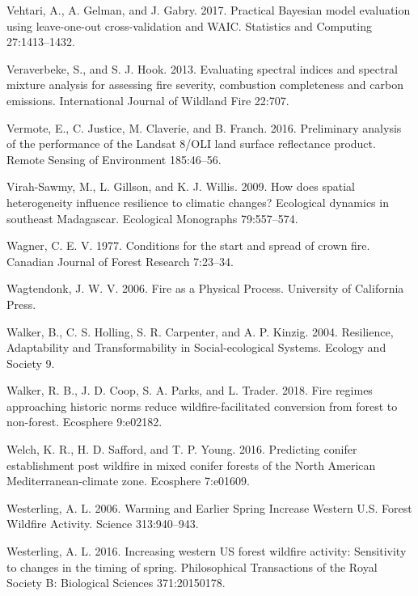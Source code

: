 \documentclass[twoside,12pt,final]{ucthesis-CA2012}
\begin{document}
\begin{ucmainmatter}
\hypertarget{ref-vehtari2017}{}
Vehtari, A., A. Gelman, and J. Gabry. 2017. Practical Bayesian model
evaluation using leave-one-out cross-validation and WAIC. Statistics and
Computing 27:1413--1432.

\hypertarget{ref-veraverbeke2013}{}
Veraverbeke, S., and S. J. Hook. 2013. Evaluating spectral indices and
spectral mixture analysis for assessing fire severity, combustion
completeness and carbon emissions. International Journal of Wildland
Fire 22:707.

\hypertarget{ref-vermote2016}{}
Vermote, E., C. Justice, M. Claverie, and B. Franch. 2016. Preliminary
analysis of the performance of the Landsat 8/OLI land surface
reflectance product. Remote Sensing of Environment 185:46--56.

\hypertarget{ref-virah-sawmy2009}{}
Virah-Sawmy, M., L. Gillson, and K. J. Willis. 2009. How does spatial
heterogeneity influence resilience to climatic changes? Ecological
dynamics in southeast Madagascar. Ecological Monographs 79:557--574.

\hypertarget{ref-wagner1977}{}
Wagner, C. E. V. 1977. Conditions for the start and spread of crown
fire. Canadian Journal of Forest Research 7:23--34.

\hypertarget{ref-wagtendonk2006}{}
Wagtendonk, J. W. V. 2006. Fire as a Physical Process. University of
California Press.

\hypertarget{ref-walker2004}{}
Walker, B., C. S. Holling, S. R. Carpenter, and A. P. Kinzig. 2004.
Resilience, Adaptability and Transformability in Social-ecological
Systems. Ecology and Society 9.

\hypertarget{ref-walker2018}{}
Walker, R. B., J. D. Coop, S. A. Parks, and L. Trader. 2018. Fire
regimes approaching historic norms reduce wildfire-facilitated
conversion from forest to non-forest. Ecosphere 9:e02182.

\hypertarget{ref-welch2016}{}
Welch, K. R., H. D. Safford, and T. P. Young. 2016. Predicting conifer
establishment post wildfire in mixed conifer forests of the North
American Mediterranean-climate zone. Ecosphere 7:e01609.

\hypertarget{ref-westerling2006}{}
Westerling, A. L. 2006. Warming and Earlier Spring Increase Western U.S.
Forest Wildfire Activity. Science 313:940--943.

\hypertarget{ref-westerling2016}{}
Westerling, A. L. 2016. Increasing western US forest wildfire activity:
Sensitivity to changes in the timing of spring. Philosophical
Transactions of the Royal Society B: Biological Sciences 371:20150178.


\end{ucmainmatter}
\end{document}
